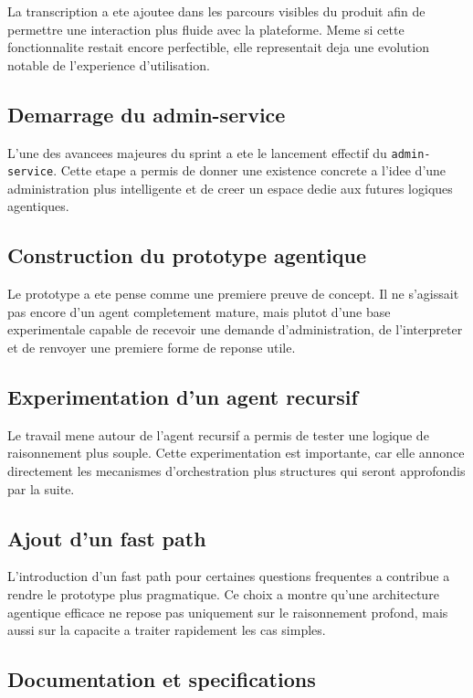 La transcription a ete ajoutee dans les parcours visibles du produit afin de permettre une interaction plus fluide avec la plateforme. Meme si cette fonctionnalite restait encore perfectible, elle representait deja une evolution notable de l'experience d'utilisation.

\subsection{Demarrage du admin-service}

L'une des avancees majeures du sprint a ete le lancement effectif du \texttt{admin-service}. Cette etape a permis de donner une existence concrete a l'idee d'une administration plus intelligente et de creer un espace dedie aux futures logiques agentiques.

\subsection{Construction du prototype agentique}

Le prototype a ete pense comme une premiere preuve de concept. Il ne s'agissait pas encore d'un agent completement mature, mais plutot d'une base experimentale capable de recevoir une demande d'administration, de l'interpreter et de renvoyer une premiere forme de reponse utile.

\subsection{Experimentation d'un agent recursif}

Le travail mene autour de l'agent recursif a permis de tester une logique de raisonnement plus souple. Cette experimentation est importante, car elle annonce directement les mecanismes d'orchestration plus structures qui seront approfondis par la suite.

\subsection{Ajout d'un fast path}

L'introduction d'un fast path pour certaines questions frequentes a contribue a rendre le prototype plus pragmatique. Ce choix a montre qu'une architecture agentique efficace ne repose pas uniquement sur le raisonnement profond, mais aussi sur la capacite a traiter rapidement les cas simples.

\subsection{Documentation et specifications}

